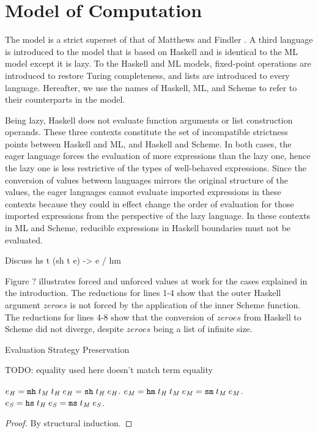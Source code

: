 \section{Model of Computation}

The model is a strict superset of that of Matthews and Findler \cite{matthews07}. A third language is introduced to the model that is based on Haskell and is identical to the ML model except it is lazy. To the Haskell and ML models, fixed-point operations are introduced to restore Turing completeness, and lists are introduced to every language. Hereafter, we use the names of Haskell, ML, and Scheme to refer to their counterparts in the model.

Being lazy, Haskell does not evaluate function arguments or list construction operands. These three contexts constitute the set of incompatible strictness points between Haskell and ML, and Haskell and Scheme. In both cases, the eager language forces the evaluation of more expressions than the lazy one, hence the lazy one is less restrictive of the types of well-behaved expressions. Since the conversion of values between languages mirrors the original structure of the values, the eager languages cannot evaluate imported expressions in these contexts because they could in effect change the order of evaluation for those imported expressions from the perspective of the lazy language. In these contexts in ML and Scheme, reducible expressions in Haskell boundaries must not be evaluated.










Discuss hs t (sh t e) -> e / hm

Figure ? illustrates forced and unforced values at work for the cases explained in the introduction. The reductions for lines 1-4 show that the outer Haskell argument $zeroes$ is not forced by the application of the inner Scheme function. The reductions for lines 4-8 show that the conversion of $zeroes$ from Haskell to Scheme did not diverge, despite $zeroes$ being a list of infinite size.

\begin{theorem}{Evaluation Strategy Preservation}

TODO: equality used here doesn't match term equality

\label{thmstr}
$e_{\mathit{H}} = \mathtt{mh} \; t_{\mathit{M}} \; t_{\mathit{H}} \; e_{\mathit{H}} = \mathtt{sh} \; t_{\mathit{H}} \; e_{\mathit{H}}$.
$e_{\mathit{M}} = \mathtt{hm} \; t_{\mathit{H}} \; t_{\mathit{M}} \; e_{\mathit{M}} = \mathtt{sm} \; t_{\mathit{M}} \; e_{\mathit{M}}$.
$e_{\mathit{S}} = \mathtt{hs} \; t_{\mathit{H}} \; e_{\mathit{S}} = \mathtt{ms} \; t_{\mathit{M}} \; e_{\mathit{S}}$.
\begin{proof}
By structural induction.
\end{proof}
\end{theorem}

